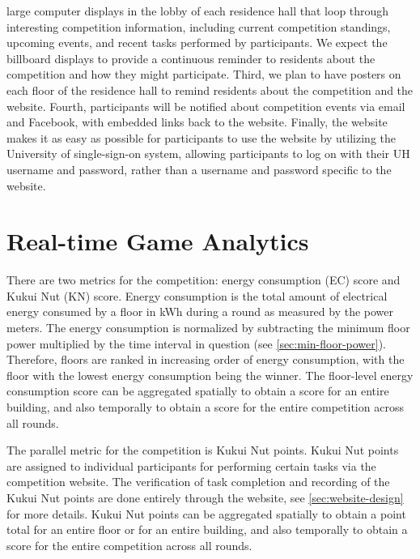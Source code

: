 large computer displays in the lobby of each residence hall that loop through interesting competition information, including current competition standings, upcoming events, and recent tasks performed by participants. We expect the billboard displays to provide a continuous reminder to residents about the competition and how they might participate. Third, we plan to have posters on each floor of the residence hall to remind residents about the competition and the website. Fourth, participants will be notified about competition events via email and Facebook, with embedded links back to the website. Finally, the website makes it as easy as possible for participants to use the website by utilizing the University of \Hawaii single-sign-on system, allowing participants to log on with their UH username and password, rather than a username and password specific to the website.

\section{Real-time Game Analytics}

There are two metrics for the competition: energy consumption (EC) score and Kukui Nut (KN) score. Energy consumption is the total amount of electrical energy consumed by a floor in kWh during a round as measured by the power meters. The energy consumption is normalized by subtracting the minimum floor power multiplied by the time interval in question (see \autoref{sec:min-floor-power}). Therefore, floors are ranked in increasing order of energy consumption, with the floor with the lowest energy consumption being the winner. The floor-level energy consumption score can be aggregated spatially to obtain a score for an entire building, and also temporally to obtain a score for the entire competition across all rounds.

The parallel metric for the competition is Kukui Nut points. Kukui Nut points are assigned to individual participants for performing certain tasks via the competition website. The verification of task completion and recording of the Kukui Nut points are done entirely through the website, see \autoref{sec:website-design} for more details. Kukui Nut points can be aggregated spatially to obtain a point total for an entire floor or for an entire building, and also temporally to obtain a score for the entire competition across all rounds.